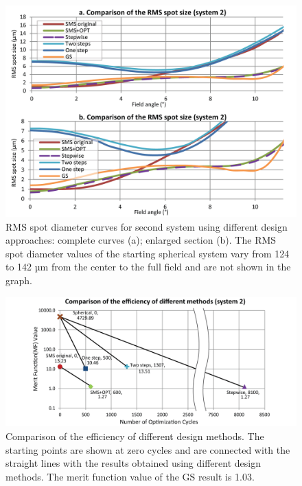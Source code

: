 \begin{figure}[h!]
    \centering
    \includegraphics[width=1\textwidth]{chapter-5/figures/Fig10_case2_rms.png}
    \caption{RMS spot diameter curves for second system using different design approaches: complete curves (a); enlarged section (b). The RMS spot diameter values of the starting spherical system vary from 124 to 142 µm from the center to the full field and are not shown in the graph.}
    \label{fig: fig10_case2_rmsCurvecompare}
\end{figure}

\begin{figure}[h!]
    \centering
    \includegraphics[width=1\textwidth]{chapter-5/figures/Figure11_OE340147.png}
    \caption{Comparison of the efficiency of different design methods. The starting points are shown at zero cycles and are connected with the straight lines with the results obtained using different design methods. The merit function value of the GS result is 1.03.}
    \label{fig: fig11_case2_efficiencyCompare}
\end{figure}

